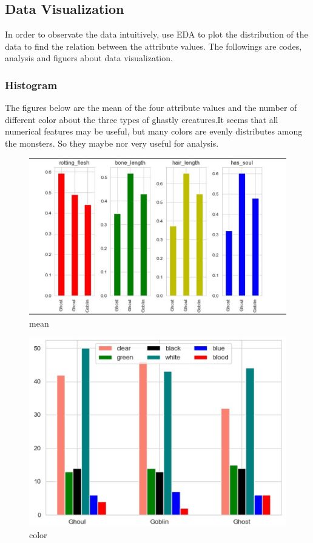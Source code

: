 \subsection{Data Visualization}
In order to observate the data intuitively, use EDA to plot the distribution of the data to find the relation between the attribute values. The followings are codes, analysis and figuers about data visualization.\\

\subsubsection{ Histogram}
The figures below are the mean of the four attribute values  and the number of different color about the three types of ghastly creatures.It seems that all numerical features may be useful, but many colors are evenly distributes among the monsters. So they maybe nor very useful for analysis.\\


\begin{figure}[htbp]\centering
	\includegraphics[scale=0.3]{figures/his_1.eps}
	\caption{mean}
\end{figure}


\begin{figure}[htbp]\centering
	\includegraphics[scale=0.3]{figures/his_2.eps}
	\caption{color}
\end{figure}


